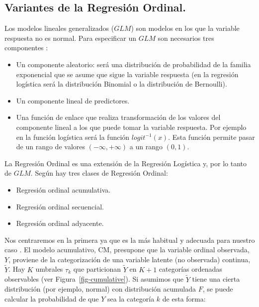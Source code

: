 \documentclass[
  12pt,
  a4paper,
  extrafontsizes,
  onecolumn,
  openright]{memoir}
\providecommand{\tightlist}{%
  \setlength{\itemsep}{0pt}\setlength{\parskip}{0pt}}\usepackage{longtable,booktabs,array}
\begin{document}
\hypertarget{variantes-de-la-regresiuxf3n-ordinal.}{%
\subsection{Variantes de la Regresión
Ordinal.}\label{variantes-de-la-regresiuxf3n-ordinal.}}

Los modelos lineales generalizados (\(GLM\)) son modelos en los que la
variable respuesta no es normal. Para especificar un \(GLM\) son
necesarios tres componentes \autocite[ver][]{oconnell2006}:

\begin{itemize}
\tightlist
\item
  Un componente aleatorio: será una distribución de probabilidad de la
  familia exponencial que se asume que sigue la variable respuesta (en
  la regresión logística será la distribución Binomial o la distribución
  de Bernoulli).
\item
  Un componente lineal de predictores.
\item
  Una función de enlace que realiza transformación de los valores del
  componente lineal a los que puede tomar la variable respuesta. Por
  ejemplo en la función logística será la función \(logit^{-1}(x)\).
  Esta función permite pasar de un rango de valores
  \((-\infty, +\infty)\) a un rango \((0, 1)\).
\end{itemize}

La Regresión Ordinal es una extensión de la Regresión Logística y, por
lo tanto de \(GLM\). Según \textcite{burkner2019} hay tres clases de
Regresión Ordinal:

\begin{itemize}
\tightlist
\item
  Regresión ordinal acumulativa.
\item
  Regresión ordinal secuencial.
\item
  Regresión ordinal adyacente.
\end{itemize}

Nos centraremos en la primera ya que es la más habitual y adecuada para
nuestro caso \autocite[ver][pp.~23-24]{burkner2019}. El modelo
acumulativo, CM, presupone que la variable ordinal observada, \(Y\),
proviene de la categorización de una variable latente (no observada)
continua, \(\tilde{Y}\). Hay \(K\) umbrales \(\tau_k\) que particionan
\(\tilde{Y}\) en \(K + 1\) categorías ordenadas observables (ver
Figura~\ref{fig-cumulative}). Si asumimos que \(\tilde{Y}\) tiene una
cierta distribución (por ejemplo, normal) con distribución acumulada
\(F\), se puede calcular la probabilidad de que \(Y\) sea la categoría
\(k\) de esta forma:
\end{document}

